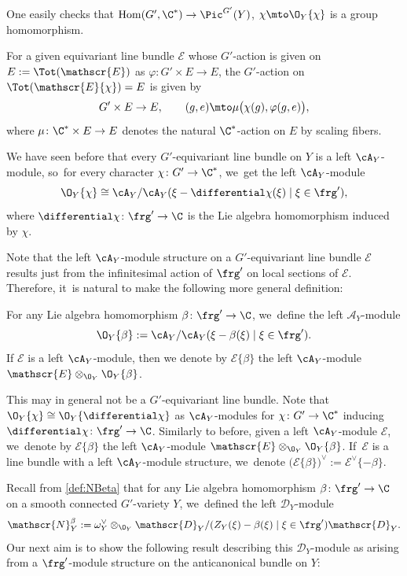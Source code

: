 One easily checks that
$\operatorname{Hom}(G', \C^*) \to \Pic^{G'}(Y)$, $\chi \mto \O_Y\{\chi\}$ is a group homomorphism.

\begin{rmk}
For a given equivariant line bundle $\mathscr{E}$ whose $G'$-action is given on $E := \Tot(\mathscr{E})$ as $\varphi \colon G' \times E \to E$, the $G'$-action on $\Tot(\mathscr{E}\{\chi\}) = E$ is given by
\[
G' \times E \to E, \qquad (g,e) \mto \mu\big(\chi(g),\varphi(g,e)\big),
\]
where $\mu \colon \C^* \times E \to E$ denotes the natural $\C^*$-action on $E$ by scaling fibers.
\end{rmk}

We have seen before that every $G'$-equivariant line bundle on $Y$ is a left $\cA_Y$\nobreakdash-mod\-ule, so~for every character $\chi \colon G' \to \C^*$, we~get the left $\cA_Y$\nobreakdash-mod\-ule
\[
\O_Y\{\chi\} \cong \cA_Y/\cA_Y (\xi - \differential\chi(\xi) \mid \xi \in \frg'),
\]
where $\differential\chi \colon \frg' \to \C$ is the Lie algebra homomorphism induced by $\chi$.

Note that the left $\cA_Y$\nobreakdash-mod\-ule structure on a $G'$-equivariant line bundle $\mathscr{E}$ results just from the infinitesimal action of $\frg'$ on local sections of $\mathscr{E}$. Therefore, it~is natural to make the following more general definition:

\begin{dfn} For any Lie algebra homomorphism $\beta \colon \frg' \to \C$, we~define the left $\mathscr A_Y$\nobreakdash-mod\-ule
\[
\O_Y\{\beta\} := \cA_Y/\cA_Y (\xi - \beta(\xi) \mid \xi \in \frg').
\]
If $\mathscr E$ is a left $\cA_Y$\nobreakdash-mod\-ule, then we denote by $\mathscr E \{\beta\}$ the left $\cA_Y$\nobreakdash-mod\-ule $\mathscr{E} \otimes_{\O_Y} \O_Y\{\beta\}$.
\end{dfn}
This may in general not be a $G'$-equivariant line bundle. Note that $\O_Y\{\chi\} \cong \O_Y\{\differential \chi\}$ as $\cA_Y$\nobreakdash-mod\-ules for $\chi \colon G' \to \C^*$ inducing $\differential\chi \colon \frg' \to \C$. Similarly to before, given a left $\cA_Y$\nobreakdash-mod\-ule $\mathscr E$, we~denote by $\mathscr E \{\beta\}$ the left $\cA_Y$\nobreakdash-mod\-ule $\mathscr{E} \otimes_{\O_Y} \O_Y\{\beta\}$. If~$\mathscr E$ is a line bundle with a left $\cA_Y$\nobreakdash-mod\-ule structure, we~denote $\mathscr (\mathscr E\{\beta\})^\vee := \mathscr E^\vee\{-\beta\}$.

Recall from \cref{def:NBeta} that for any Lie algebra homomorphism $\beta \colon \frg' \to \C$ on a smooth connected $G'$-variety $Y$, we~defined the left $\mathscr{D}_Y$\nobreakdash-mod\-ule
\[
\mathscr{N}_{Y}^{\beta} := \omega_Y^\vee \otimes_{\O_Y} \mathscr{D}_Y / (Z_Y(\xi)-\beta(\xi) \mid \xi \in \frg') \mathscr{D}_Y.
\]
Our next aim is to show the following result describing this $\mathscr{D}_Y$\nobreakdash-mod\-ule as arising from a $\frg'$\nobreakdash-mod\-ule structure on the anticanonical bundle on $Y$:


